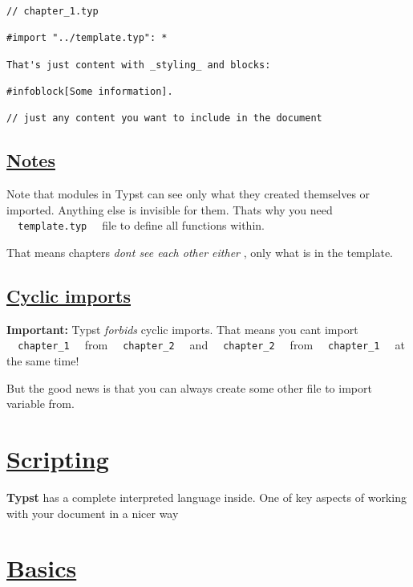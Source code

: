 \begin{verbatim}
// chapter_1.typ

#import "../template.typ": *

That's just content with _styling_ and blocks:

#infoblock[Some information].

// just any content you want to include in the document
\end{verbatim}

\subsection{\texorpdfstring{\hyperref[notes]{Notes}}{Notes}}\label{notes}

Note that modules in Typst can see only what they created themselves or
imported. Anything else is invisible for them. That\textquotesingle s
why you need \texttt{\ }{\texttt{\ template.typ\ }}\texttt{\ } file to
define all functions within.

That means chapters \emph{don\textquotesingle t see each other either} ,
only what is in the template.

\subsection{\texorpdfstring{\hyperref[cyclic-imports]{Cyclic
imports}}{Cyclic imports}}\label{cyclic-imports}

\textbf{Important:} Typst \emph{forbids} cyclic imports. That means you
can\textquotesingle t import
\texttt{\ }{\texttt{\ chapter\_1\ }}\texttt{\ } from
\texttt{\ }{\texttt{\ chapter\_2\ }}\texttt{\ } and
\texttt{\ }{\texttt{\ chapter\_2\ }}\texttt{\ } from
\texttt{\ }{\texttt{\ chapter\_1\ }}\texttt{\ } at the same time!

But the good news is that you can always create some other file to
import variable from.

\section{\texorpdfstring{\hyperref[scripting]{Scripting}}{Scripting}}\label{scripting}

\textbf{Typst} has a complete interpreted language inside. One of key
aspects of working with your document in a nicer way

\section{\texorpdfstring{\hyperref[basics]{Basics}}{Basics}}\label{basics}

